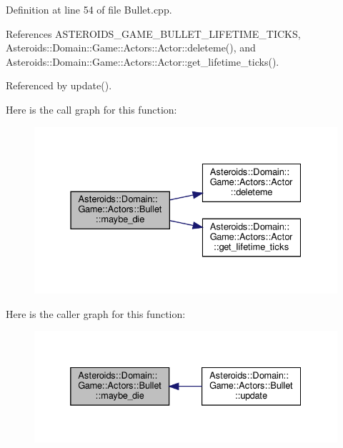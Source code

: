 Definition at line 54 of file Bullet.\+cpp.



References A\+S\+T\+E\+R\+O\+I\+D\+S\+\_\+\+G\+A\+M\+E\+\_\+\+B\+U\+L\+L\+E\+T\+\_\+\+L\+I\+F\+E\+T\+I\+M\+E\+\_\+\+T\+I\+C\+KS, Asteroids\+::\+Domain\+::\+Game\+::\+Actors\+::\+Actor\+::deleteme(), and Asteroids\+::\+Domain\+::\+Game\+::\+Actors\+::\+Actor\+::get\+\_\+lifetime\+\_\+ticks().



Referenced by update().

Here is the call graph for this function\+:\nopagebreak
\begin{figure}[H]
\begin{center}
\leavevmode
\includegraphics[width=331pt]{classAsteroids_1_1Domain_1_1Game_1_1Actors_1_1Bullet_aa5772b07856c5191c8ccdf5d0df568e8_cgraph}
\end{center}
\end{figure}
Here is the caller graph for this function\+:\nopagebreak
\begin{figure}[H]
\begin{center}
\leavevmode
\includegraphics[width=332pt]{classAsteroids_1_1Domain_1_1Game_1_1Actors_1_1Bullet_aa5772b07856c5191c8ccdf5d0df568e8_icgraph}
\end{center}
\end{figure}
\mbox{\label{classAsteroids_1_1Domain_1_1Game_1_1Actors_1_1Bullet_ae3837ed471d290688f684e8187e6865e}} 
